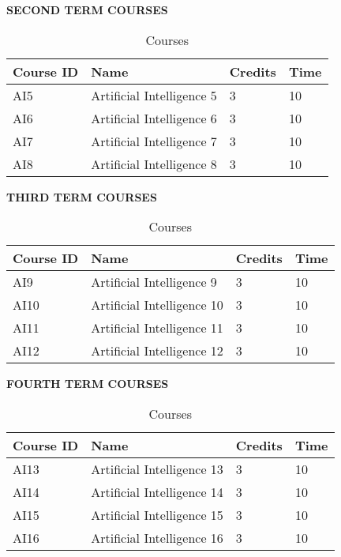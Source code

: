 \documentclass{article}
\begin{document}
\noindent
\textbf{\large SECOND TERM COURSES }\\

\begin{table}[H]
    \caption{Courses}
    \label{tab:n}
    \centering
    \begin{tabularx}{\textwidth}{*{4}{X}}
      \toprule
      Course ID & Name & Credits & Time  \\ 
      \midrule
      AI5 & Artificial Intelligence 5         & 3          & 10        \\ 
      \midrule
      AI6 & Artificial Intelligence 6         & 3         & 10         \\ 
      \midrule
      AI7 & Artificial Intelligence 7        & 3         & 10        \\ 
      \midrule
      AI8 & Artificial Intelligence 8        & 3        & 10        \\
      \bottomrule
    \end{tabularx}
\end{table}

\noindent
\textbf{\large THIRD TERM COURSES }\\

\begin{table}[H]
    \caption{Courses}
    \label{tab:n}
    \centering
    \begin{tabularx}{\textwidth}{*{4}{X}}
      \toprule
      Course ID & Name & Credits & Time  \\ 
      \midrule
      AI9 & Artificial Intelligence 9        & 3          & 10        \\ 
      \midrule
      AI10 & Artificial Intelligence 10         & 3          & 10         \\ 
      \midrule
      AI11 & Artificial Intelligence 11         & 3         & 10        \\ 
      \midrule
      AI12 & Artificial Intelligence 12        & 3         & 10        \\
      \bottomrule
    \end{tabularx}
\end{table}

\noindent
\textbf{\large FOURTH TERM COURSES }\\

\begin{table}[H]
    \caption{Courses}
    \label{tab:n}
    \centering
    \begin{tabularx}{\textwidth}{*{4}{X}}
      \toprule
      Course ID & Name & Credits & Time  \\ 
      \midrule
      AI13 & Artificial Intelligence 13         & 3          & 10        \\ 
      \midrule
      AI14 & Artificial Intelligence 14         & 3          & 10          \\ 
      \midrule
      AI15 & Artificial Intelligence 15         & 3         & 10        \\ 
      \midrule
      AI16 & Artificial Intelligence 16        & 3         & 10        \\
      \bottomrule
    \end{tabularx}
\end{table}
\end{document}
